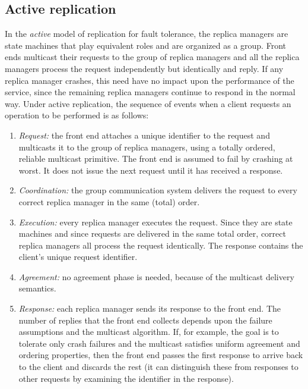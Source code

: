\subsection{Active replication}
In the \textit{active} model of replication for fault tolerance, the replica managers are state machines that play equivalent roles and are organized as a group. Front ends multicast their requests to the group of replica managers and all the replica managers process the request independently but identically and reply. If any replica manager crashes, this need have no impact upon the performance of the service, since the remaining replica managers continue to respond in the normal way. Under active replication, the sequence of events when a client requests an operation to be performed is as follows:
\begin{enumerate}
	\item \textit{Request:} the front end attaches a unique identifier to the request and multicasts it to the group of replica managers, using a totally ordered, reliable multicast primitive. The front end is assumed to fail by crashing at worst. It does not issue the next request until it has received a response.
	\item \textit{Coordination:} the group communication system delivers the request to every correct replica manager in the same (total) order.
	\item \textit{Execution:} every replica manager executes the request. Since they are state machines and since requests are delivered in the same total order, correct replica managers all process the request identically. The response contains the client’s unique request identifier.
	\item \textit{Agreement:} no agreement phase is needed, because of the multicast delivery semantics.
	\item \textit{Response:} each replica manager sends its response to the front end. The number of replies that the front end collects depends upon the failure assumptions and the multicast algorithm. If, for example, the goal is to tolerate only crash failures and the multicast satisfies uniform agreement and ordering properties, then the front end passes the first response to arrive back to the client and discards the rest (it can distinguish these from responses to other requests by examining the identifier in the response).
\end{enumerate}

